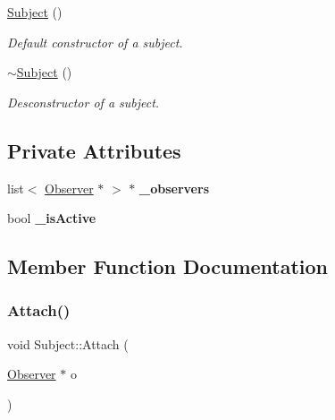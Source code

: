 \begin{DoxyCompactItemize}
\item 
\hypertarget{class_subject_ab468044832c824c6d6c2f46272655207}{}\label{class_subject_ab468044832c824c6d6c2f46272655207} 
\hyperlink{class_subject_ab468044832c824c6d6c2f46272655207}{Subject} ()
\begin{DoxyCompactList}\small\item\em Default constructor of a subject. \end{DoxyCompactList}\item 
\hypertarget{class_subject_a7c4f522850f718466e5be7eb55ba1969}{}\label{class_subject_a7c4f522850f718466e5be7eb55ba1969} 
\hyperlink{class_subject_a7c4f522850f718466e5be7eb55ba1969}{$\sim$\+Subject} ()
\begin{DoxyCompactList}\small\item\em Desconstructor of a subject. \end{DoxyCompactList}\end{DoxyCompactItemize}
\subsection*{Private Attributes}
\begin{DoxyCompactItemize}
\item 
\hypertarget{class_subject_ae56790ee37926285584afc6dbd502f3b}{}\label{class_subject_ae56790ee37926285584afc6dbd502f3b} 
list$<$ \hyperlink{class_observer}{Observer} $\ast$ $>$ $\ast$ {\bfseries \+\_\+observers}
\item 
\hypertarget{class_subject_a7f66c9e8c7ec5a2ecbc1f6144871399a}{}\label{class_subject_a7f66c9e8c7ec5a2ecbc1f6144871399a} 
bool {\bfseries \+\_\+is\+Active}
\end{DoxyCompactItemize}


\subsection{Member Function Documentation}
\hypertarget{class_subject_a4178d3cef008c713370791c6578334de}{}\label{class_subject_a4178d3cef008c713370791c6578334de} 
\subsubsection{\texorpdfstring{Attach()}{Attach()}}
{\footnotesize\ttfamily void Subject\+::\+Attach (\begin{DoxyParamCaption}\item[{\hyperlink{class_observer}{Observer} $\ast$}]{o }\end{DoxyParamCaption})\hspace{0.3cm}{\ttfamily [virtual]}}

